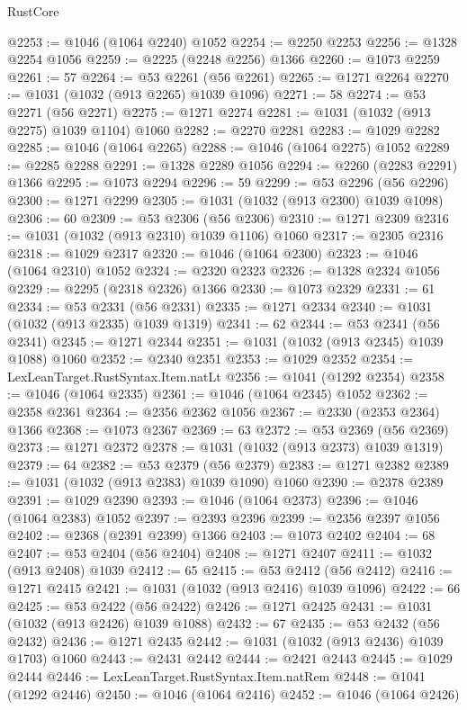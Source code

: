 \begin{lexlean}{RustCore}
\begin{coremodule}
@2253 := @1046 (@1064 @2240) @1052
@2254 := @2250 @2253
@2256 := @1328 @2254 @1056
@2259 := @2225 (@2248 @2256) @1366
@2260 := @1073 @2259
@2261 := 57
@2264 := @53 @2261 (@56 @2261)
@2265 := @1271 @2264
@2270 := @1031 (@1032 (@913 @2265) @1039 @1096)
@2271 := 58
@2274 := @53 @2271 (@56 @2271)
@2275 := @1271 @2274
@2281 := @1031 (@1032 (@913 @2275) @1039 @1104) @1060
@2282 := @2270 @2281
@2283 := @1029 @2282
@2285 := @1046 (@1064 @2265)
@2288 := @1046 (@1064 @2275) @1052
@2289 := @2285 @2288
@2291 := @1328 @2289 @1056
@2294 := @2260 (@2283 @2291) @1366
@2295 := @1073 @2294
@2296 := 59
@2299 := @53 @2296 (@56 @2296)
@2300 := @1271 @2299
@2305 := @1031 (@1032 (@913 @2300) @1039 @1098)
@2306 := 60
@2309 := @53 @2306 (@56 @2306)
@2310 := @1271 @2309
@2316 := @1031 (@1032 (@913 @2310) @1039 @1106) @1060
@2317 := @2305 @2316
@2318 := @1029 @2317
@2320 := @1046 (@1064 @2300)
@2323 := @1046 (@1064 @2310) @1052
@2324 := @2320 @2323
@2326 := @1328 @2324 @1056
@2329 := @2295 (@2318 @2326) @1366
@2330 := @1073 @2329
@2331 := 61
@2334 := @53 @2331 (@56 @2331)
@2335 := @1271 @2334
@2340 := @1031 (@1032 (@913 @2335) @1039 @1319)
@2341 := 62
@2344 := @53 @2341 (@56 @2341)
@2345 := @1271 @2344
@2351 := @1031 (@1032 (@913 @2345) @1039 @1088) @1060
@2352 := @2340 @2351
@2353 := @1029 @2352
@2354 := LexLeanTarget.RustSyntax.Item.natLt
@2356 := @1041 (@1292 @2354)
@2358 := @1046 (@1064 @2335)
@2361 := @1046 (@1064 @2345) @1052
@2362 := @2358 @2361
@2364 := @2356 @2362 @1056
@2367 := @2330 (@2353 @2364) @1366
@2368 := @1073 @2367
@2369 := 63
@2372 := @53 @2369 (@56 @2369)
@2373 := @1271 @2372
@2378 := @1031 (@1032 (@913 @2373) @1039 @1319)
@2379 := 64
@2382 := @53 @2379 (@56 @2379)
@2383 := @1271 @2382
@2389 := @1031 (@1032 (@913 @2383) @1039 @1090) @1060
@2390 := @2378 @2389
@2391 := @1029 @2390
@2393 := @1046 (@1064 @2373)
@2396 := @1046 (@1064 @2383) @1052
@2397 := @2393 @2396
@2399 := @2356 @2397 @1056
@2402 := @2368 (@2391 @2399) @1366
@2403 := @1073 @2402
@2404 := 68
@2407 := @53 @2404 (@56 @2404)
@2408 := @1271 @2407
@2411 := @1032 (@913 @2408) @1039
@2412 := 65
@2415 := @53 @2412 (@56 @2412)
@2416 := @1271 @2415
@2421 := @1031 (@1032 (@913 @2416) @1039 @1096)
@2422 := 66
@2425 := @53 @2422 (@56 @2422)
@2426 := @1271 @2425
@2431 := @1031 (@1032 (@913 @2426) @1039 @1088)
@2432 := 67
@2435 := @53 @2432 (@56 @2432)
@2436 := @1271 @2435
@2442 := @1031 (@1032 (@913 @2436) @1039 @1703) @1060
@2443 := @2431 @2442
@2444 := @2421 @2443
@2445 := @1029 @2444
@2446 := LexLeanTarget.RustSyntax.Item.natRem
@2448 := @1041 (@1292 @2446)
@2450 := @1046 (@1064 @2416)
@2452 := @1046 (@1064 @2426)

\end{coremodule}
\end{lexlean}

